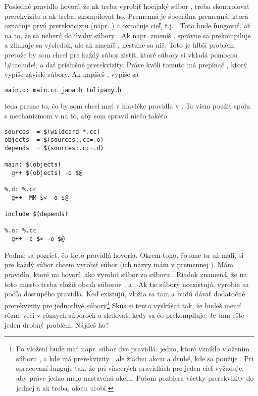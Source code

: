 Posledné pravidlo hovorí, že ak treba vyrobiť hocijaký súbor , treba skontrolovať prerekvizitu  a ak treba, skompilovať ho. Premenná \vb{\$<} je
špeciálna premenná, ktorá označuje prvú prerekviciztu (napr. ) a  označuje cieľ, t.j. . 
Toto bude fungovať, až na to, že sa neberú do úvahy súbory . Ak napr. zmeníš , správne sa prekompiluje  a zlinkuje sa výsledok, ale
ak zmeníš , nestane sa nič. Toto je hlbší problém, pretože by som chcel pre každý súbor  zistiť, ktoré súbory si vkladá pomocou \prg!#include!, a dať príslušné
prerekvizity. Práve kvôli tomuto má  prepínač , ktorý vypíše závislé súbory. Ak napíšeš , vypíše sa 

\begin{Verbatim}
main.o: main.cc jama.h tulipany.h
\end{Verbatim}

teda presne to, čo by som chcel mať v hlavičke pravidla v . To viem použiť spolu s mechanizmom  v  na to, aby som spravil niečo takéto

\begin{Verbatim}[frame=single]
sources  = $(wildcard *.cc)
objects  = $(sources:.cc=.o)
depends  = $(sources:.cc=.d)

main: $(objects)
  g++ $(objects) -o $@

%.d: %.cc
  g++ -MM $< -o $@

include $(depends)

%.o: %.cc
  g++ -c $< -o $@
\end{Verbatim}

Poďme sa pozrieť, čo tieto pravidlá hovoria. Okrem toho, čo sme tu už mali, si pre každý súbor chcem vyrobiť súbor  (ich názvy mám v premennej ).
Mám pravidlo, ktoré mi hovorí, ako vyrobiť súbor  zo súboru . Riadok  znamená, že na toto miesto treba vložiť obsah súborov
,  a . Ak tie súbory neexistujú, vyrobia sa podľa dostupého pravidla. Keď existujú, vložia sa tam a budú dávať dodatočné prerekvizity
pre jednotlivé  súbory\footnote{Po vložení bude mať napr. súbor  dve pravidlá: jedno, ktoré vzniklo vložením súboru , a
kde má prerekvizity , ale žiadnu akciu
a druhé, kde sa použije . Pri spracovaní  funguje tak, že pri viacerých pravidlách pre jeden cieľ vyžaduje, aby práve jedno malo nastavenú akciu.
Potom pozbiera všetky prerekvizity do jednej a ak treba, akciu urobí.}
Skús si tento  vyskúšať tak, že budeš meniť rôzne veci v rôznych súboroch a sledovať, kedy sa čo prekompiluje. Je tam ešte jeden drobný problém. Nájdeš ho?


